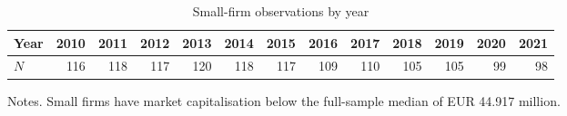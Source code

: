 \begin{table}[H]
  \centering
  \singlespacing
  \caption{Small-firm observations by year}
  \label{tab:small_firms}
  \begin{tabular}{@{}lrrrrrrrrrrrr@{}}
    \toprule
    Year & 2010 & 2011 & 2012 & 2013 & 2014 & 2015 & 2016 & 2017 & 2018 & 2019 & 2020 & 2021 \\
    \midrule
    $N$ & 116 & 118 & 117 & 120 & 118 & 117 & 109 & 110 & 105 & 105 & 99 & 98 \\
    \bottomrule
  \end{tabular}

  \medskip
  \begin{minipage}{\textwidth}
    Notes. Small firms have market capitalisation below the full-sample median of EUR 44.917 million.
  \end{minipage}
\end{table}
